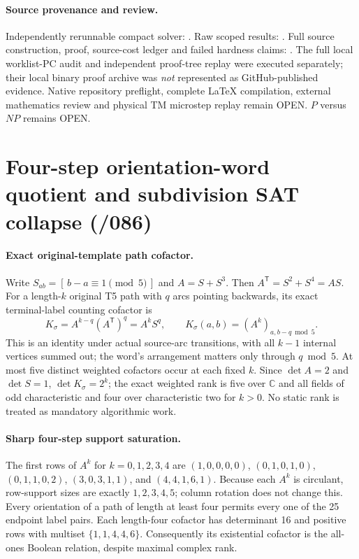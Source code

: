 \documentclass[11pt]{article}
\begin{document}
\paragraph{Source provenance and review.}
Independently rerunnable compact solver:
.
Raw scoped results:
.
Full source construction, proof, source-cost ledger and failed
hardness claims:
.
The full local worklist-PC audit and independent proof-tree replay
were executed separately; their local binary proof archive was
\emph{not} represented as GitHub-published evidence.
Native repository preflight, complete \LaTeX{} compilation,
external mathematics review and physical TM microstep replay
remain OPEN. $P$ versus $NP$ remains OPEN.

\section{Four-step orientation-word quotient and subdivision SAT collapse (/086)}
\paragraph{Exact original-template path cofactor.}
Write $S_{ab}=[\,b-a\equiv1\pmod5\,]$ and $A=S+S^3$.
Then $A^{\mathsf T}=S^2+S^4=AS$. For a length-$k$
original T5 path with $q$ arcs pointing backwards,
its exact terminal-label counting cofactor is
\[
\boxed{K_\sigma=A^{k-q}(A^{\mathsf T})^q=A^kS^q,\qquad
 K_\sigma(a,b)=(A^k)_{a,b-q\bmod5}.}
\]
This is an identity under actual source-arc transitions, with
all $k-1$ internal vertices summed out; the word's
arrangement matters only through $q\bmod5$. At most five
distinct weighted cofactors occur at each fixed $k$.
Since $\det A=2$ and $\det S=1$, $\det K_\sigma=2^k$;
the exact weighted rank is five over $\mathbb C$ and
all fields of odd characteristic and four over characteristic
two for $k>0$. No static rank is treated as mandatory
algorithmic work.
\paragraph{Sharp four-step support saturation.}
The first rows of $A^k$ for $k=0,1,2,3,4$ are
$(1,0,0,0,0)$, $(0,1,0,1,0)$, $(0,1,1,0,2)$,
$(3,0,3,1,1)$, and $(4,4,1,6,1)$.
Because each $A^k$ is circulant, row-support sizes
are exactly $1,2,3,4,5$; column rotation does
not change this. Every orientation of a path of length
at least four permits every one of the 25 endpoint
label pairs. Each length-four cofactor has determinant
16 and positive rows with multiset $\{1,1,4,4,6\}$.
Consequently its existential cofactor is the all-ones
Boolean relation, despite maximal complex rank.
\end{document}
